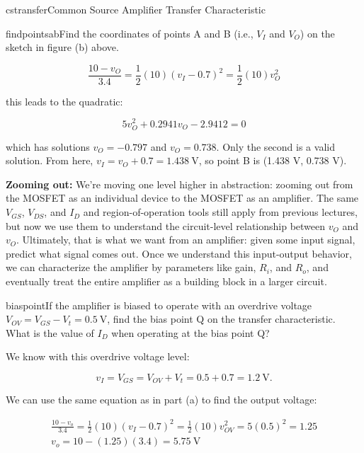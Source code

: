 \begin{mainquestion}{cstransfer}{Common Source Amplifier Transfer Characteristic}
\begin{partquestion}{findpointsab}{Find the coordinates of points A and B (i.e., $V_{I}$ and $V_{O}$) on the sketch in figure (b) above.}
\begin{answer}
\[
\frac{10 - v_{O}}{3.4} = \frac{1}{2}(10)(v_{I} - 0.7)^{2} = \frac{1}{2}(10)v_{O}^{2}
\]

this leads to the quadratic:

\[
5 v_{O}^{2} + 0.2941 v_{O} - 2.9412 = 0
\]

which has solutions $v_{O} = -0.797$ and $v_{O} = 0.738$. Only the second is a valid solution. From here, $v_{I} = v_{O} + 0.7 = \qty{1.438}{\volt}$, so point B is (1.438 V, 0.738 V).

\begin{kaitlyn}

\textbf{Zooming out:} We’re moving one level higher in abstraction: zooming out from the MOSFET as an individual device to the MOSFET as an amplifier. The same $V_{GS}$, $V_{DS}$, and $I_{D}$ and region-of-operation tools still apply from previous lectures, but now we use them to understand the circuit-level relationship between $v_O$ and $v_O$. Ultimately, that is what we want from an amplifier: given some input signal, predict what signal comes out. Once we understand this input-output behavior, we can characterize the amplifier by parameters like gain, $R_i$, and $R_o$, and eventually treat the entire amplifier as a building block in a larger circuit.

    
\end{kaitlyn}


    
\end{answer}
\end{partquestion}

\begin{partquestion}{biaspoint}{If the amplifier is biased to operate with an overdrive voltage $V_{OV} = V_{GS} - V_{t} = \qty{0.5}{\volt}$, find the bias point Q on the transfer characteristic. What is the value of $I_{D}$ when operating at the bias point Q?}
\begin{answer}
We know with this overdrive voltage level:

\[
v_{I} = V_{GS} = V_{OV} + V_{t} = 0.5 + 0.7 = \qty{1.2}{\volt}.
\]

We can use the same equation as in part (a) to find the output voltage:

\begin{gather*}
    \frac{10 - v_o}{3.4} = \frac{1}{2}(10)(v_I - 0.7)^2 = \frac{1}{2}(10)v_{OV}^2 = 5(0.5)^2 = 1.25 \\
    v_o = 10 - (1.25)(3.4) = \qty{5.75}{\volt}
\end{gather*}


\end{answer}
\end{partquestion}
\end{mainquestion}
